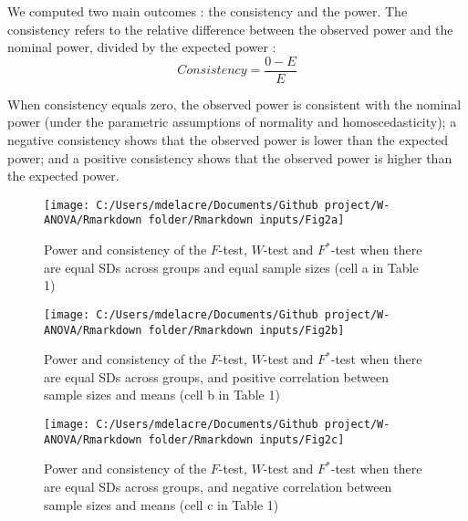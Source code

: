 \documentclass[
  english,
  man]{apa6}
\begin{document}
We computed two main outcomes : the consistency and the power. The consistency refers to the relative difference between the observed power and the nominal power, divided by the expected power :
\begin{equation*} 
Consistency=\frac{0-E}{E}
\label{eqn:RDPWtest}
\end{equation*}

When consistency equals zero, the observed power is consistent with the nominal power (under the parametric assumptions of normality and homoscedasticity); a negative consistency shows that the observed power is lower than the expected power; and a positive consistency shows that the observed power is higher than the expected power.

\begin{landscape}
\newpage

\begin{figure}

{\centering \texttt{[image: C:/Users/mdelacre/Documents/Github project/W-ANOVA/Rmarkdown folder/Rmarkdown inputs/Fig2a]} 

}

\caption{Power and consistency of the $F$-test, $W$-test and $F^*$-test when there are equal SDs across groups and equal sample sizes (cell a in Table 1)}\label{fig:Fig10}
\end{figure}

\end{landscape}
\newpage
\begin{landscape}

\begin{figure}

{\centering \texttt{[image: C:/Users/mdelacre/Documents/Github project/W-ANOVA/Rmarkdown folder/Rmarkdown inputs/Fig2b]} 

}

\caption{Power and consistency of the $F$-test, $W$-test and $F^*$-test when there are equal SDs across groups, and positive correlation between sample sizes and means (cell b in Table 1)}\label{fig:Fig11}
\end{figure}

\end{landscape}
\newpage
\begin{landscape}

\begin{figure}

{\centering \texttt{[image: C:/Users/mdelacre/Documents/Github project/W-ANOVA/Rmarkdown folder/Rmarkdown inputs/Fig2c]} 

}

\caption{Power and consistency of the $F$-test, $W$-test and $F^*$-test when there are equal SDs across groups, and negative correlation between sample sizes and means (cell c in Table 1)}\label{fig:Fig12}
\end{figure}

\end{landscape}
\end{document}
